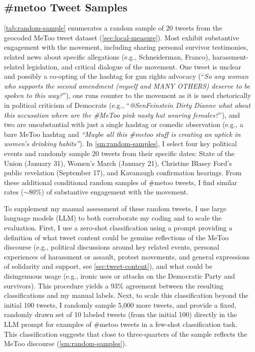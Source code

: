 \documentclass[manuscript,screen,nonacm,11pt,acm]{acmart}
\begin{document}
\subsection{\#metoo Tweet Samples}
\label{sec:tweet-samples}
\cref{tab:random-sample} enumerates a random sample of 20 tweets from the geocoded MeToo tweet dataset (\cref{sec:local-measure}).
Most exhibit substantive engagement with the movement, including sharing personal survivor testimonies, related news about specific allegations (e.g., Schneiderman, Franco), harassment-related legislation, and critical dialogue of the movement.
One tweet is unclear and possibly a co-opting of the hashtag for gun rights advocacy (``\textit{So any woman who supports the second amendment (myself and MANY OTHERS) deserve to be spoken to this way?}''), one runs counter to the movement as it is used rhetorically in political criticism of Democrats (e.g., ``\textit{@SenFeinstein Dirty Dianne what about this accusation where are the \#MeToo pink nasty hat wearing females?}''), and two are unsubstantial with just a single hashtag or comedic observation (e.g., a bare MeToo hashtag and \textit{``Maybe all this \#metoo stuff is creating an uptick in women's drinking habits''}).
In \cref{sm:random-samples}, I select four key political events and randomly sample 20 tweets from their specific dates: State of the Union (January 31), Women's March (January 21), Christine Blasey Ford's public revelation (September 17), and Kavanaugh confirmation hearings.
From these additional conditional random samples of \#metoo tweets, I find similar rates ($\sim$80\%) of substantive engagement with the movement.

To supplement my manual assessment of these random tweets, I use large language models (LLM) to both corroborate my coding and to scale the evaluation.
First, I use a zero-shot classification using a prompt providing a definition of what tweet content could be genuine reflections of the MeToo discourse (e.g., political discussions around key related events, personal experiences of harassment or assault, protest movements, and general expressions of solidarity and support, see \cref{sec:tweet-content}), and what could be disingenuous usage (e.g., ironic uses or attacks on the Democratic Party and survivors).
This procedure yields a 93\% agreement between the resulting classifications and my manual labels.
Next, to scale this classification beyond the initial 100 tweets, I randomly sample 5,000 more tweets, and provide a fixed, randomly drawn set of 10 labeled tweets (from the initial 100) directly in the LLM prompt for examples of \#metoo tweets in a few-shot classification task.
This classification suggests that close to three-quarters of the sample reflects the MeToo discourse (\cref{sm:random-samples}).
\end{document}
